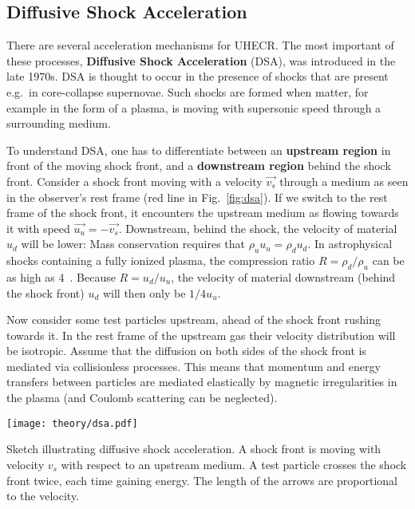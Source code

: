 \subsection{Diffusive Shock Acceleration}\label{dsa}
There are several acceleration mechanisms for UHECR. The most important of these processes, \textbf{Diffusive Shock Acceleration} (DSA), was introduced in the late 1970s. DSA is thought to occur in the presence of shocks that are present e.g.\ in core-collapse supernovae. Such shocks are formed when matter, for example in the form of a plasma, is moving with supersonic speed through a surrounding medium.

To understand DSA, one has to differentiate between an \textbf{upstream region} in front of the moving shock front, and a \textbf{downstream region} behind the shock front. Consider a shock front moving with a velocity $\vec{v_s}$ through a medium as seen in the observer's rest frame (red line in Fig.~\ref{fig:dsa}). If we switch to the rest frame of the shock front, it encounters the upstream medium as flowing towards it with speed $\vec{u_u}=-\vec{v_s}$. Downstream, behind the shock, the velocity of material $u_d$ will be lower: Mass conservation requires that $\rho_u u_u = \rho_d u_d$. In astrophysical shocks containing a fully ionized plasma, the compression ratio $R=\rho_d/\rho_u$ can be as high as 4~. Because $R=u_d/u_u$, the velocity of material downstream (behind the shock front) $u_d$ will then only be $1/4 u_u$.

Now consider some test particles upstream, ahead of the shock front rushing towards it. In the rest frame of the upstream gas their velocity distribution will be isotropic. Assume that the diffusion on both sides of the shock front is mediated via collisionless processes. This means that momentum and energy transfers between particles are mediated elastically by magnetic irregularities in the plasma (and Coulomb scattering can be neglected).

\begin{marginfigure}
    \texttt{[image: theory/dsa.pdf]}
    \caption[Diffusive shock acceleration]{Sketch illustrating diffusive shock acceleration. A shock front is moving with velocity $v_s$ with respect to an upstream medium. A test particle crosses the shock front twice, each time gaining energy. The length of the arrows are proportional to the velocity.}
\end{marginfigure}

